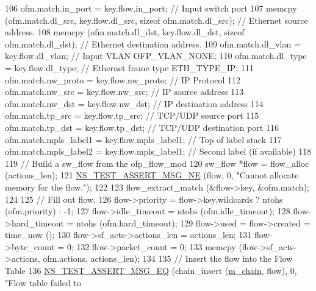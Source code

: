 \begin{DoxyCode}
106   ofm.match.in\_port = key.flow.in\_port;                                \textcolor{comment}{// Input switch port}
107   memcpy (ofm.match.dl\_src, key.flow.dl\_src, \textcolor{keyword}{sizeof} ofm.match.dl\_src); \textcolor{comment}{// Ethernet source address.}
108   memcpy (ofm.match.dl\_dst, key.flow.dl\_dst, \textcolor{keyword}{sizeof} ofm.match.dl\_dst); \textcolor{comment}{// Ethernet destination address.}
109   ofm.match.dl\_vlan = key.flow.dl\_vlan;                                \textcolor{comment}{// Input VLAN OFP\_VLAN\_NONE;}
110   ofm.match.dl\_type = key.flow.dl\_type;                                \textcolor{comment}{// Ethernet frame type ETH\_TYPE\_IP;}
111   ofm.match.nw\_proto = key.flow.nw\_proto;                              \textcolor{comment}{// IP Protocol}
112   ofm.match.nw\_src = key.flow.nw\_src;                                  \textcolor{comment}{// IP source address}
113   ofm.match.nw\_dst = key.flow.nw\_dst;                                  \textcolor{comment}{// IP destination address}
114   ofm.match.tp\_src = key.flow.tp\_src;                                  \textcolor{comment}{// TCP/UDP source port}
115   ofm.match.tp\_dst = key.flow.tp\_dst;                                  \textcolor{comment}{// TCP/UDP destination port}
116   ofm.match.mpls\_label1 = key.flow.mpls\_label1;                        \textcolor{comment}{// Top of label stack}
117   ofm.match.mpls\_label2 = key.flow.mpls\_label1;                        \textcolor{comment}{// Second label (if available)}
118 
119   \textcolor{comment}{// Build a sw\_flow from the ofp\_flow\_mod}
120   sw\_flow *flow = flow\_alloc (actions\_len);
121   \hyperlink{group__testing_ga73d66fb0050a5111453fd144e767b91a}{NS\_TEST\_ASSERT\_MSG\_NE} (flow, 0, \textcolor{stringliteral}{"Cannot allocate memory for the flow."});
122 
123   flow\_extract\_match (&flow->key, &ofm.match);
124 
125   \textcolor{comment}{// Fill out flow.}
126   flow->priority = flow->key.wildcards ? ntohs (ofm.priority) : -1;
127   flow->idle\_timeout = ntohs (ofm.idle\_timeout);
128   flow->hard\_timeout = ntohs (ofm.hard\_timeout);
129   flow->used = flow->created = time\_now ();
130   flow->sf\_acts->actions\_len = actions\_len;
131   flow->byte\_count = 0;
132   flow->packet\_count = 0;
133   memcpy (flow->sf\_acts->actions, ofm.actions, actions\_len);
134 
135   \textcolor{comment}{// Insert the flow into the Flow Table}
136   \hyperlink{group__testing_ga2a9d78cffb3db8e867c35fff0b698cf5}{NS\_TEST\_ASSERT\_MSG\_EQ} (chain\_insert (\hyperlink{classSwitchFlowTableTestCase_a8f2e13cbf268c880500b1f2898b3558a}{m\_chain}, flow), 0, \textcolor{stringliteral}{"Flow table failed to
}
\end{DoxyCode}
